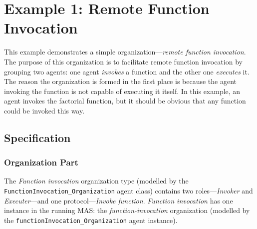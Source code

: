 
\section{Example 1: Remote Function Invocation}

This example demonstrates a simple organization---\textit{remote function invocation}.
The purpose of this organization is to facilitate remote function invocation by grouping two agents: one agent \textit{invokes} a function and the other one \textit{executes} it.
The reason the organization is formed in the first place is because the agent invoking the function is not capable of executing it itself.
In this example, an agent invokes the factorial function, but it should be obvious that any function could be invoked this way.

\subsection*{Specification}

\subsubsection*{Organization Part}

The \textit{Function invocation} organization type (modelled by the \texttt{FunctionInvocation\_Organization} agent class) contains two roles---\textit{Invoker} and \textit{Executer}---and one protocol---\textit{Invoke function}.
\textit{Function invocation} has one instance in the running MAS: the \textit{function-invocation} organization (modelled by the \texttt{functionInvocation\_Organization} agent instance).

